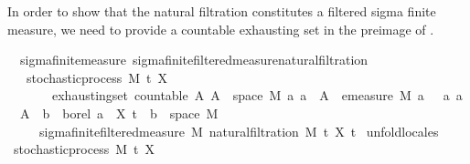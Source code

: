 \begin{isabellebody}
\endisatagproof
{\isafoldproof}%
%
\isadelimproof
%
\endisadelimproof
%
\begin{isamarkuptext}%
In order to show that the natural filtration constitutes a filtered sigma finite measure, we need to provide a countable exhausting set in the preimage of .%
\end{isamarkuptext}\isamarkuptrue%
\isamarkupfalse%
\ {\isacharparenleft}{\kern0pt}\ sigma{\isacharunderscore}{\kern0pt}finite{\isacharunderscore}{\kern0pt}measure{\isacharparenright}{\kern0pt}\ sigma{\isacharunderscore}{\kern0pt}finite{\isacharunderscore}{\kern0pt}filtered{\isacharunderscore}{\kern0pt}measure{\isacharunderscore}{\kern0pt}natural{\isacharunderscore}{\kern0pt}filtration{\isacharcolon}{\kern0pt}\isanewline
\ \ \ {\isachardoublequoteopen}stochastic{\isacharunderscore}{\kern0pt}process\ M\ t\ X{\isachardoublequoteclose}\isanewline
\ \ \ \ \ \ \ exhausting{\isacharunderscore}{\kern0pt}set{\isacharcolon}{\kern0pt}\ {\isachardoublequoteopen}countable\ A{\isachardoublequoteclose}\ {\isachardoublequoteopen}{\isacharparenleft}{\kern0pt}{\isasymUnion}A{\isacharparenright}{\kern0pt}\ {\isacharequal}{\kern0pt}\ space\ M{\isachardoublequoteclose}\ {\isachardoublequoteopen}{\isasymAnd}a{\isachardot}{\kern0pt}\ a\ {\isasymin}\ A\ {\isasymLongrightarrow}\ emeasure\ M\ a\ {\isasymnoteq}\ {\isasyminfinity}{\isachardoublequoteclose}\ {\isachardoublequoteopen}{\isasymAnd}a{\isachardot}{\kern0pt}\ a\ {\isasymin}\ A\ {\isasymLongrightarrow}\ {\isasymexists}b\ {\isasymin}\ borel{\isachardot}{\kern0pt}\ a\ {\isacharequal}{\kern0pt}\ X\ t\ {\isacharminus}{\kern0pt}{\isacharbackquote}{\kern0pt}\ b\ {\isasyminter}\ space\ M{\isachardoublequoteclose}\isanewline
\ \ \ \ \ {\isachardoublequoteopen}sigma{\isacharunderscore}{\kern0pt}finite{\isacharunderscore}{\kern0pt}filtered{\isacharunderscore}{\kern0pt}measure\ M\ {\isacharparenleft}{\kern0pt}natural{\isacharunderscore}{\kern0pt}filtration\ M\ t\ X{\isacharparenright}{\kern0pt}\ t\isanewline
%
\isadelimproof
%
\endisadelimproof
%
\isatagproof
{}\isamarkupfalse%
\ {\isacharparenleft}{\kern0pt}unfold{\isacharunderscore}{\kern0pt}locales{\isacharparenright}{\kern0pt}\isanewline
\ \ \isamarkupfalse%
\ stochastic{\isacharunderscore}{\kern0pt}process\ M\ t\ X\ \isamarkupfalse%

\end{isabellebody}

